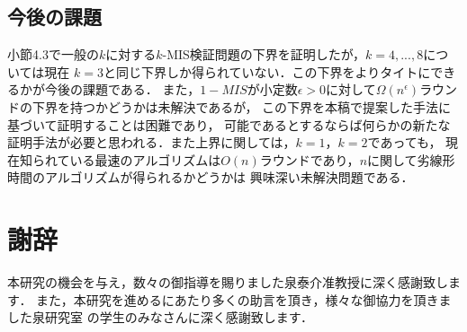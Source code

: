 \documentclass[11pt,a4paper]{jarticle}
\theoremstyle{definition}
\begin{document}
\subsection{今後の課題}
小節4.3で一般の$k$に対する$k$-MIS検証問題の下界を証明したが，$k = 4,...,8$については現在
$k=3$と同じ下界しか得られていない．この下界をよりタイトにできるかが今後の課題である．
また，$1-MIS$が小定数$\epsilon > 0$に対して$\Omega(n^{\epsilon})$ラウンドの下界を持つかどうかは未解決であるが，
この下界を本稿で提案した手法に基づいて証明することは困難であり，
可能であるとするならば何らかの新たな証明手法が必要と思われる．また上界に関しては，$k=1$，$k=2$であっても，
現在知られている最速のアルゴリズムは$O(n)$ラウンドであり，$n$に関して劣線形時間のアルゴリズムが得られるかどうかは
興味深い未解決問題である．

\section*{謝辞}
本研究の機会を与え，数々の御指導を賜りました泉泰介准教授に深く感謝致します．
また，本研究を進めるにあたり多くの助言を頂き，様々な御協力を頂きました泉研究室
の学生のみなさんに深く感謝致します．


\end{document}
